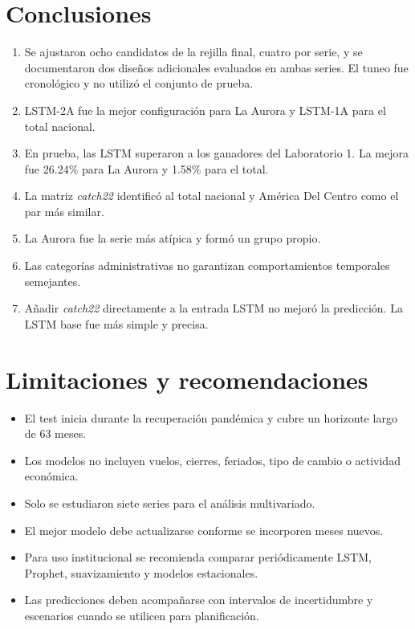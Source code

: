\documentclass[11pt,letterpaper]{article}
\begin{document}
\section{Conclusiones}

\begin{enumerate}
  \item Se ajustaron ocho candidatos de la rejilla final, cuatro por serie,
  y se documentaron dos diseños adicionales evaluados en ambas series. El
  tuneo fue cronológico y no utilizó el conjunto de prueba.
  \item LSTM-2A fue la mejor configuración para La Aurora y LSTM-1A para el
  total nacional.
  \item En prueba, las LSTM superaron a los ganadores del Laboratorio 1. La
  mejora fue 26.24\% para La Aurora y 1.58\% para el total.
  \item La matriz \textit{catch22} identificó al total nacional y América Del
  Centro como el par más similar.
  \item La Aurora fue la serie más atípica y formó un grupo propio.
  \item Las categorías administrativas no garantizan comportamientos
  temporales semejantes.
  \item Añadir \textit{catch22} directamente a la entrada LSTM no mejoró la
  predicción. La LSTM base fue más simple y precisa.
\end{enumerate}

\vspace{5cm}

\section{Limitaciones y recomendaciones}

\begin{itemize}
  \item El test inicia durante la recuperación pandémica y cubre un horizonte
  largo de 63 meses.
  \item Los modelos no incluyen vuelos, cierres, feriados, tipo de cambio o
  actividad económica.
  \item Solo se estudiaron siete series para el análisis multivariado.
  \item El mejor modelo debe actualizarse conforme se incorporen meses nuevos.
  \item Para uso institucional se recomienda comparar periódicamente LSTM,
  Prophet, suavizamiento y modelos estacionales.
  \item Las predicciones deben acompañarse con intervalos de incertidumbre y
  escenarios cuando se utilicen para planificación.
\end{itemize}
\end{document}
